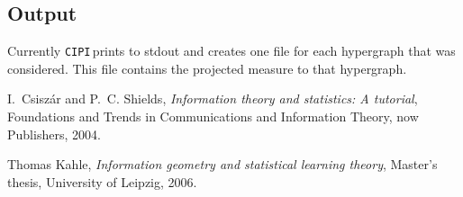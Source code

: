 \documentclass[12pt]{amsart}
\newcommand{\cipi}{\texttt{CIPI}\,}
\theoremstyle{plain}%
\theoremstyle{definition}
\theoremstyle{remark}
\begin{document}
\subsection{Output}
Currently \cipi prints to stdout and creates one file for each hypergraph that was considered. This
file contains the projected measure to that hypergraph.

\providecommand{\bysame}{\leavevmode\hbox to3em{\hrulefill}\thinspace}
\providecommand{\MR}{\relax\ifhmode\unskip\space\fi MR }
\providecommand{\MRhref}[2]{%
  \href{http://www.ams.org/mathscinet-getitem?mr=#1}{#2}
}
\providecommand{\href}[2]{#2}
\begin{thebibliography}{Kah06}

I.~Csisz{\'a}r and P.~C. Shields, \emph{Information theory and statistics: A
  tutorial}, Foundations and Trends in Communications and Information Theory,
  now Publishers, 2004.

Thomas Kahle, \emph{Information geometry and statistical learning theory},
  Master's thesis, University of Leipzig, 2006.

\end{thebibliography}

% 
% 
\end{document}
